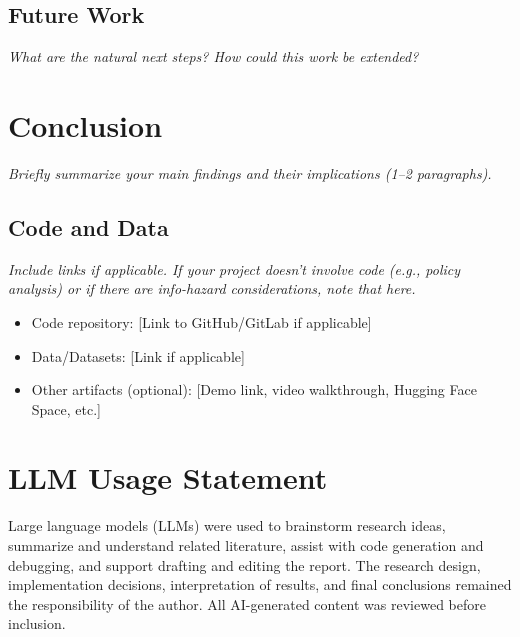 \documentclass[11pt,a4paper]{article}
\newcommand{\guidance}[1]{\textit{#1}}
\begin{document}
\subsection*{Future Work}
\guidance{What are the natural next steps? How could this work be extended?}

\section{Conclusion}
\guidance{Briefly summarize your main findings and their implications (1--2 paragraphs).}

\subsection*{Code and Data}
\guidance{Include links if applicable. If your project doesn't involve code (e.g., policy analysis) or if there are info-hazard considerations, note that here.}
\begin{itemize}
\item Code repository: [Link to GitHub/GitLab if applicable]
\item Data/Datasets: [Link if applicable]
\item Other artifacts (optional): [Demo link, video walkthrough, Hugging Face Space, etc.]
\end{itemize}




 



\section*{LLM Usage Statement}
Large language models (LLMs) were used to brainstorm research ideas, summarize and understand related literature, assist with code generation and debugging, and support drafting and editing the report. The research design, implementation decisions, interpretation of results, and final conclusions remained the responsibility of the author. All AI-generated content was reviewed before inclusion.
\end{document}
